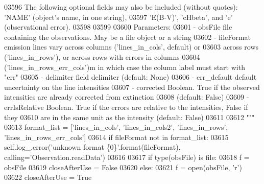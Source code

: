 \begin{DoxyCode}
{{{{{{{{{{{{{{{{{{{{{{03596 \textcolor{stringliteral}{        The following optional fields may also be included (without quotes): 'NAME' (object's name, in one
       string), }
03597 \textcolor{stringliteral}{        'E(B-V)', 'cHbeta', and 'e' (observational error).}
03598 \textcolor{stringliteral}{        }
03599 \textcolor{stringliteral}{ }
03600 \textcolor{stringliteral}{        Parameters:}
03601 \textcolor{stringliteral}{            - obsFile        file containing the observations. May be a file object or a string }
03602 \textcolor{stringliteral}{            - fileFormat     emission lines vary across columns ('lines\_in\_cols', default) or }
03603 \textcolor{stringliteral}{                                across rows ('lines\_in\_rows'), or across rows with errors in columns }
03604 \textcolor{stringliteral}{                                ('lines\_in\_rows\_err\_cols')m in which case the column label must start with 
      "err"}
03605 \textcolor{stringliteral}{            - delimiter      field delimiter (default: None)  }
03606 \textcolor{stringliteral}{            - err\_default    default uncertainty on the line intensities}
03607 \textcolor{stringliteral}{            - corrected      Boolean. True if the observed intensities are already corrected from
       extinction}
03608 \textcolor{stringliteral}{                                 (default: False)}
03609 \textcolor{stringliteral}{            - errIsRelative  Boolean. True if the errors are relative to the intensities, False if they}
03610 \textcolor{stringliteral}{                                 are in the same unit as the intensity (default: False)}
03611 \textcolor{stringliteral}{}
03612 \textcolor{stringliteral}{        """}    
03613         format\_list = [\textcolor{stringliteral}{'lines\_in\_cols'}, \textcolor{stringliteral}{'lines\_in\_cols2'}, \textcolor{stringliteral}{'lines\_in\_rows'}, \textcolor{stringliteral}{'lines\_in\_rows\_err\_cols'}]
03614         \textcolor{keywordflow}{if} fileFormat \textcolor{keywordflow}{not} \textcolor{keywordflow}{in} format\_list:
03615             self.log\_.error(\textcolor{stringliteral}{'unknown format \{0\}'}.format(fileFormat), calling=\textcolor{stringliteral}{'Observation.readData'})
03616 
03617         \textcolor{keywordflow}{if} type(obsFile) \textcolor{keywordflow}{is} file:
03618             f = obsFile
03619             closeAfterUse = \textcolor{keyword}{False}
03620         \textcolor{keywordflow}{else}:
03621             f = open(obsFile, \textcolor{stringliteral}{'}\textcolor{stringliteral}{r')}
03622 \textcolor{stringliteral}{            closeAfterUse = }\textcolor{keyword}{True}
}}}}}}}}}}}}}}}}}}}}}}
\end{DoxyCode}

